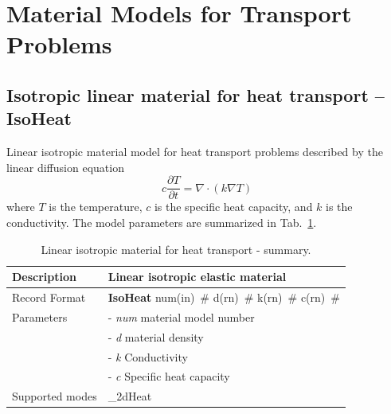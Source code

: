 \documentclass[a4paper]{article}
\newcommand{\descitem}[1]{{\noindent \bf #1}}
\newcommand{\elemparam}[2]{{{#1\tiny (#2)}~\#}}
\newcommand{\param}[1]{{\it #1}}
\newenvironment{mmt}{\begin{tabular}{|l|p{9cm}|}}{\end{tabular}\\}
\newenvironment{mmt}{\begin{tabular}{|l|l|}}{\end{tabular}\\}
\begin{document}
\clearpage

\section{Material Models for Transport Problems}
\subsection{Isotropic linear material for heat transport -- IsoHeat}
\label{IsoLET}
Linear isotropic material model for heat transport problems described
by the linear diffusion equation
\begin{equation}\label{lindiffheat}
c\frac{\partial T}{\partial t} = \nabla \cdot \left( k \nabla T \right)
\end{equation}
where $T$ is the temperature, $c$ is the specific heat capacity,
and $k$ is the conductivity.
The model parameters are summarized
in Tab.~\ref{Isoheat_table}.

\begin{table}[!htb]
\begin{mmt}
\hline
Description & Linear isotropic elastic material\\
\hline
Record Format & \descitem{IsoHeat} \elemparam{num}{in}
\elemparam{d}{rn} \elemparam{k}{rn} \elemparam{c}{rn}\\
Parameters &- \param{num} material model number\\
&- \param{d} material density\\
&- \param{k} Conductivity\\
&- \param{c} Specific heat capacity\\
Supported modes& \_2dHeat\\
\hline
\end{mmt}
\caption{Linear isotropic material for heat transport - summary.}
\label{Isoheat_table}
\end{table}
\end{document}
